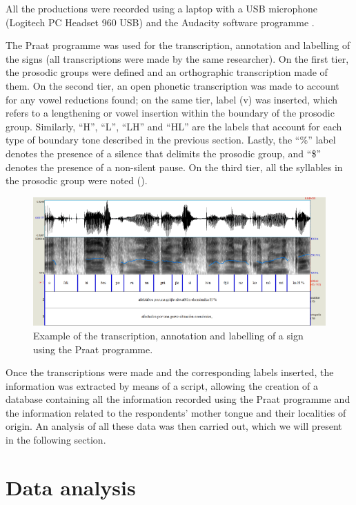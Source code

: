 \documentclass[output=paper]{langsci/langscibook}
\begin{document}
\z

  All the productions were recorded using a laptop with a USB microphone (Logitech PC Headset 960 USB) and the Audacity software programme \citep{AudacityTeam}.

  The Praat programme \citep{Boersma.praat} was used for the transcription, annotation and labelling of the signs (all transcriptions were made by the same researcher). On the first tier, the prosodic groups were defined and an orthographic transcription made of them. On the second tier, an open phonetic transcription was made to account for any vowel reductions found; on the same tier, label (v) was inserted, which refers to a lengthening or vowel insertion within the boundary of the prosodic group. Similarly, “H”, “L”, “LH” and “HL” are the labels that account for each type of boundary tone described in the previous section. Lastly, the “\%” label denotes the presence of a silence that delimits the prosodic group, and “\$” denotes the presence of a non-silent pause. On the third tier, all the syllables in the prosodic group were noted ().

\begin{figure}  
\includegraphics[width=\textwidth]{figures/GAM-img6.png}
 \caption{Example of the transcription, annotation and labelling of a sign using the Praat programme.\label{fig:gam:3}}
 \end{figure}

  Once the transcriptions were made and the corresponding labels inserted, the information was extracted by means of a script, allowing the creation of a database containing all the information recorded using the Praat programme and the information related to the respondents’ mother tongue and their localities of origin. An analysis of all these data was then carried out, which we will present in the following section. 

\section{Data analysis}
\label{sec:gam:3}
\end{document}
